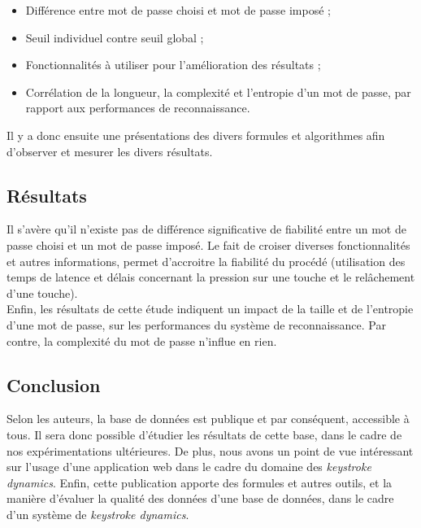\begin{itemize}
\item Différence entre mot de passe choisi et mot de passe imposé ;
\item Seuil individuel contre seuil global ;
\item Fonctionnalités à utiliser pour l'amélioration des résultats ;
\item Corrélation de la longueur, la complexité et l'entropie d'un mot de passe, par rapport aux performances de reconnaissance.\\
\end{itemize}

Il y a donc ensuite une présentations des divers formules et algorithmes afin d'observer et mesurer les divers résultats.

\subsection{Résultats}

Il s'avère qu'il n'existe pas de différence significative de fiabilité entre un mot de passe choisi et un mot de passe imposé. Le fait de croiser diverses fonctionnalités et autres informations, permet d'accroitre la fiabilité du procédé (utilisation des temps de latence et délais concernant la pression sur une touche et le relâchement d'une touche).\\

Enfin, les résultats de cette étude indiquent un impact de la taille et de l'entropie d'une mot de passe, sur les performances du système de reconnaissance. Par contre, la complexité du mot de passe n'influe en rien.

\subsection{Conclusion}

Selon les auteurs, la base de données est publique et par conséquent, accessible à tous. Il sera donc possible d'étudier les résultats de cette base, dans le cadre de nos expérimentations ultérieures. De plus, nous avons un point de vue intéressant sur l'usage d'une application web dans le cadre du domaine des \textit{ keystroke dynamics}. Enfin, cette publication apporte des formules et autres outils, et la manière d'évaluer la qualité des données d'une base de données, dans le cadre d'un système de \textit{keystroke dynamics}.
